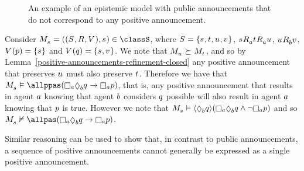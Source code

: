 \begin{example}\label{example-papal-differences}
\begin{figure}
    \caption{An example of an epistemic model with public announcements that do not correspond to any positive announcement.}\label{example-epistemic-model-2}
    \centering
\end{figure}

Consider $\kPModelAndTuple{\kStateS} \in \classS$, where $\kStates = \{\kStateS, \kStateT, \kStateU, \kStateV\}$, $\kStateS \kAccessibility{\agentA} \kStateT \kAccessibility{\agentA} \kStateU$, $\kStateU \kAccessibility{\agentB} \kStateV$, $\kValuation(\atomP) = \{\kStateS\}$ and $\kValuation(\atomQ) = \{\kStateS, \kStateV\}$.
We note that $\kPModel{\kStateU} \simulates \kPModel{\kStateT}$, and so by Lemma~\ref{positive-announcements-refinement-closed} any positive announcement that preserves $\kStateU$ must also preserve $\kStateT$.
Therefore we have that $\kPModel{\kStateS} \entails \allppas (\knows[\agentA] \suspects[\agentB] \atomQ \implies \knows[\agentA] \atomP)$, that is, any positive announcement that results in agent $a$ knowing that agent $b$ considers $q$ possible will also result in agent $a$ knowing that $p$ is true.
However we note that $\kPModel{\kStateS} \entails \announceE{\suspects[\agentB] \atomQ} (\knows[\agentA] \suspects[\agentB] \atomQ \land \neg \knows[\agentA] \atomP)$ and so $\kPModel{\kStateS} \nentails \allpas (\knows[\agentA] \suspects[\agentB] \atomQ \implies \knows[\agentA] \atomP)$.
\end{example}

Similar reasoning can be used to show that, in contrast to public announcements, a sequence of positive announcements cannot generally be expressed as a single positive announcement.

